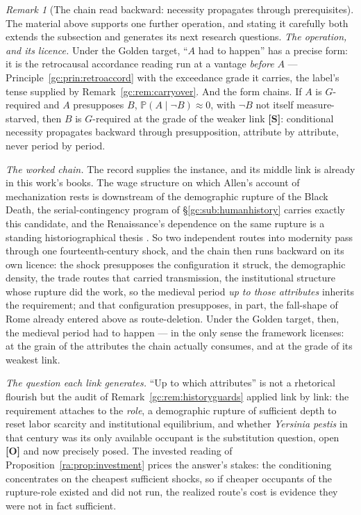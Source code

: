 \documentclass[11pt]{article}
\numberwithin{equation}{section}
\theoremstyle{plain}
\theoremstyle{definition}
\theoremstyle{remark}
\newtheorem{remark}[theorem]{Remark}
\newcommand{\PP}{\mathbb{P}}
\begin{document}
\begin{remark}[The chain read backward: necessity propagates through
prerequisites]\label{gc:rem:backwardchain}
The material above supports one further operation, and stating it
carefully both extends the subsection and generates its next research
questions. \emph{The operation, and its licence.} Under the Golden target,
``$A$ had to happen'' has a precise form: it is the retrocausal
accordance reading run at a vantage \emph{before} $A$ ---
Principle~\ref{gc:prin:retroaccord} with the exceedance grade it
carries, the label's tense supplied by Remark~\ref{gc:rem:carryover}.
And the form chains. If $A$ is $G$-required and $A$ presupposes $B$, $\PP(A\mid\neg B)\approx0$, with $\neg B$ not itself
measure-starved, then $B$ is $G$-required at the grade of the
weaker link \textbf{[S]}: conditional necessity propagates backward
through presupposition, attribute by attribute, never period by
period.

\emph{The worked chain.} The record supplies the instance, and its
middle link is already in this work's books. The wage structure on
which Allen's account of mechanization rests is downstream of the
demographic rupture of the Black Death, the serial-contingency
program of \S\ref{gc:sub:humanhistory} carries exactly this
candidate, and the Renaissance's dependence on the same rupture is
a standing historiographical thesis \cite{Herlihy97,Belich22}. So two
independent routes into modernity pass through one fourteenth-century
shock, and the chain then runs backward on its own licence: the shock
presupposes the configuration it struck, the demographic density,
the trade routes that carried transmission, the institutional
structure whose rupture did the work, so the medieval period
\emph{up to those attributes} inherits the requirement; and that
configuration presupposes, in part, the fall-shape of Rome already
entered above as route-deletion. Under the Golden target, then, the
medieval period had to happen --- in the only sense the framework
licenses: at the grain of the attributes the chain actually consumes,
and at the grade of its weakest link.

\emph{The question each link generates.} ``Up to which attributes''
is not a rhetorical flourish but the audit of
Remark~\ref{gc:rem:historyguards} applied link by link: the
requirement attaches to the \emph{role}, a demographic rupture of
sufficient depth to reset labor scarcity and institutional
equilibrium, and whether \emph{Yersinia pestis} in that century
was its only available occupant is the substitution question, open
\textbf{[O]} and now precisely posed. The invested reading of
Proposition~\ref{ra:prop:investment} prices the answer's stakes: the
conditioning concentrates on the cheapest sufficient shocks, so if
cheaper occupants of the rupture-role existed and did not run, the
realized route's cost is evidence they were not in fact sufficient.


\end{remark}
\end{document}
